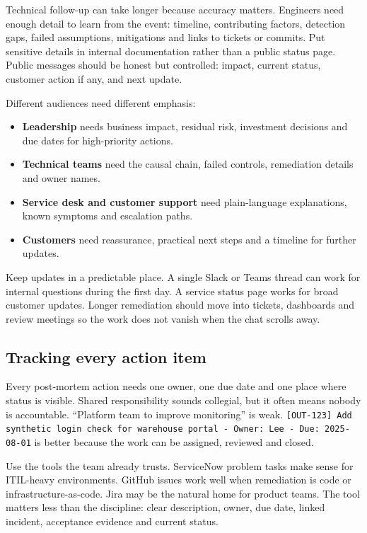 Technical follow-up can take longer because accuracy matters. Engineers need enough detail to learn from the event: timeline, contributing factors, detection gaps, failed assumptions, mitigations and links to tickets or commits. Put sensitive details in internal documentation rather than a public status page. Public messages should be honest but controlled: impact, current status, customer action if any, and next update.


Different audiences need different emphasis:


\begin{itemize}[leftmargin=*]
\item \textbf{Leadership} needs business impact, residual risk, investment decisions and due dates for high-priority actions.
\item \textbf{Technical teams} need the causal chain, failed controls, remediation details and owner names.
\item \textbf{Service desk and customer support} need plain-language explanations, known symptoms and escalation paths.
\item \textbf{Customers} need reassurance, practical next steps and a timeline for further updates.
\end{itemize}

Keep updates in a predictable place. A single Slack or Teams thread can work for internal questions during the first day. A service status page works for broad customer updates. Longer remediation should move into tickets, dashboards and review meetings so the work does not vanish when the chat scrolls away.



\subsection{Tracking every action item}


Every post-mortem action needs one owner, one due date and one place where status is visible. Shared responsibility sounds collegial, but it often means nobody is accountable. ``Platform team to improve monitoring'' is weak. \texttt{[OUT-123] Add synthetic login check for warehouse portal - Owner: Lee - Due: 2025-08-01} is better because the work can be assigned, reviewed and closed.


Use the tools the team already trusts. ServiceNow problem tasks make sense for ITIL-heavy environments. GitHub issues work well when remediation is code or infrastructure-as-code. Jira may be the natural home for product teams. The tool matters less than the discipline: clear description, owner, due date, linked incident, acceptance evidence and current status.


